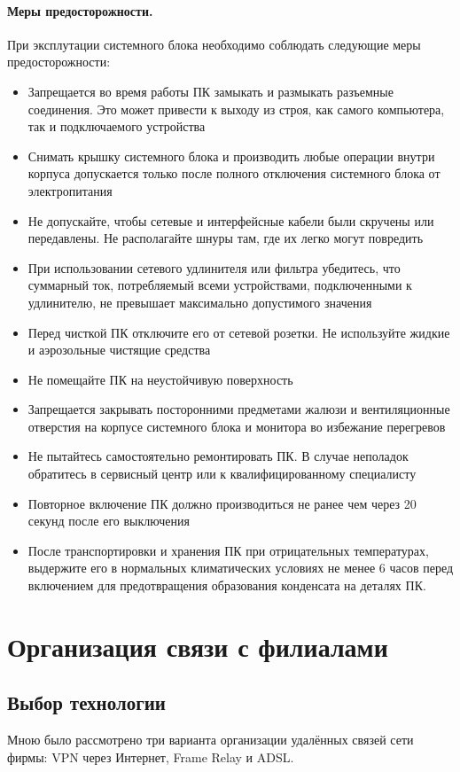 \documentclass[russian,utf8,emptystyle]{eskdtext}
\begin{document}
\paragraph{Меры предосторожности.}

При эксплутации системного блока необходимо соблюдать следующие меры предосторожности:
\begin{itemize}[label=-]
\item Запрещается во время работы ПК замыкать и размыкать разъемные соединения. Это может привести к выходу из строя, как самого компьютера, так и подключаемого устройства
\item Снимать крышку системного блока и производить любые операции внутри корпуса допускается только после полного отключения системного блока от электропитания
\item Не допускайте, чтобы сетевые и интерфейсные кабели были скручены или передавлены. Не располагайте шнуры там, где их легко могут повредить
\item При использовании сетевого удлинителя или фильтра убедитесь, что суммарный ток, потребляемый всеми устройствами, подключенными к удлинителю, не превышает максимально допустимого значения
\item Перед чисткой ПК отключите его от сетевой розетки. Не используйте жидкие и аэрозольные чистящие средства
\item Не помещайте ПК на неустойчивую поверхность
\item Запрещается закрывать посторонними предметами жалюзи и вентиляционные отверстия на корпусе системного блока и монитора во избежание перегревов
\item Не пытайтесь самостоятельно ремонтировать ПК. В случае неполадок обратитесь в сервисный центр или к квалифицированному специалисту
\item Повторное включение ПК должно производиться не ранее чем
через 20 секунд после его выключения
\item После транспортировки и хранения ПК при отрицательных температурах, выдержите его в нормальных климатических условиях    не    менее    6    часов    перед    включением    для предотвращения образования конденсата на деталях ПК.
\end{itemize}
\clearpage
\section{Организация связи с филиалами}
\subsection{Выбор технологии}
Мною было рассмотрено три варианта организации удалённых связей сети фирмы: VPN через Интернет, Frame Relay и ADSL.
\end{document}
